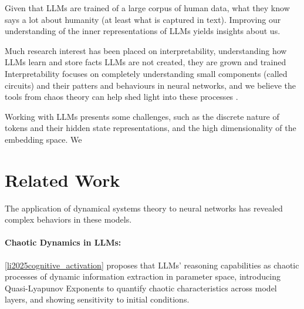 \documentclass[a4paper,12pt]{article}
\begin{document}
Given that LLMs are trained of a large corpus of human data, what they know says a lot about humanity (at least what is captured in text). Improving our understanding of the inner representations of LLMs yields insights about us.


Much research interest has been placed on interpretability, understanding how LLMs learn and store facts
LLMs are not created, they are grown and trained
Interpretability focuses on completely understanding small components (called circuits) and their patters and behaviours in neural networks, and we believe the tools from chaos theory can help shed light into these processes \cite{olah2020zoom} \cite{ameisen2025circuit} \cite{lindsey2025biology}.

Working with LLMs presents some challenges, such as the discrete nature of tokens and their hidden state representations, and the high dimensionality of the embedding space. We 

\section{Related Work}


The application of dynamical systems theory to neural networks has revealed complex behaviors in these models.  

\paragraph{Chaotic Dynamics in LLMs:}

\ref{li2025cognitive_activation} proposes that LLMs' reasoning capabilities as chaotic processes of dynamic information extraction in parameter space, introducing Quasi-Lyapunov Exponents to quantify chaotic characteristics across model layers, and showing sensitivity to initial conditions.
\end{document}
